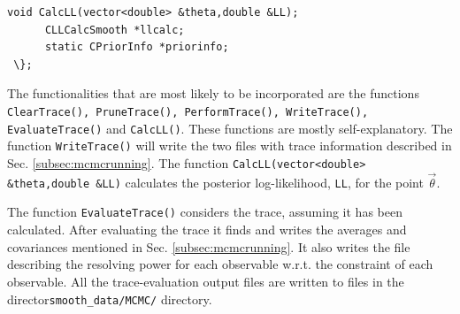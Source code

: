 \documentclass[UserManual.tex]{subfiles}
\begin{document}
\begin{sloppypar}
{\begin{Verbatim}[commandchars=\\\{\}]
      void CalcLL(vector<double> &theta,double &LL);
      CLLCalcSmooth *llcalc;
      static CPriorInfo *priorinfo;
 \};
\end{Verbatim}
}
The functionalities that are most likely to be incorporated are the functions {\tt ClearTrace(), PruneTrace(), PerformTrace(), WriteTrace(), EvaluateTrace()} and {\tt CalcLL()}. These functions are mostly self-explanatory. The function {\tt WriteTrace()} will write the two files with trace information described in Sec. \ref{subsec:mcmcrunning}. The function {\tt CalcLL(vector<double> \&theta,double \&LL)} calculates the posterior log-likelihood, {\tt LL}, for the point $\vec{\theta}$.

The function {\tt EvaluateTrace()} considers the trace, assuming it has been calculated. After evaluating the trace it finds and writes the averages and covariances mentioned in Sec. \ref{subsec:mcmcrunning}. It also writes the file describing the resolving power for each observable w.r.t. the constraint of each observable. All the trace-evaluation output files are written to files in the director{\tt smooth\_data/MCMC/} directory.

\end{sloppypar}
\end{document}
